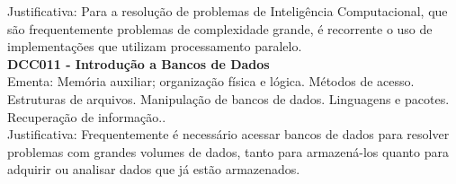 \documentclass{article}
\begin{document}
	Justificativa: Para a resolução de problemas de Inteligência Computacional, que são frequentemente problemas de complexidade grande, é recorrente o uso de implementações que utilizam processamento paralelo. \\
	\textbf{DCC011 - Introdução a Bancos de Dados} \\
	Ementa: Memória auxiliar; organização física e lógica. Métodos de acesso. Estruturas de arquivos. Manipulação de bancos de dados. Linguagens e pacotes. Recuperação de informação.. \\
	Justificativa: Frequentemente é necessário acessar bancos de dados para resolver problemas com grandes volumes de dados, tanto para armazená-los quanto para adquirir ou analisar dados que já estão armazenados. \\
\end{document}
